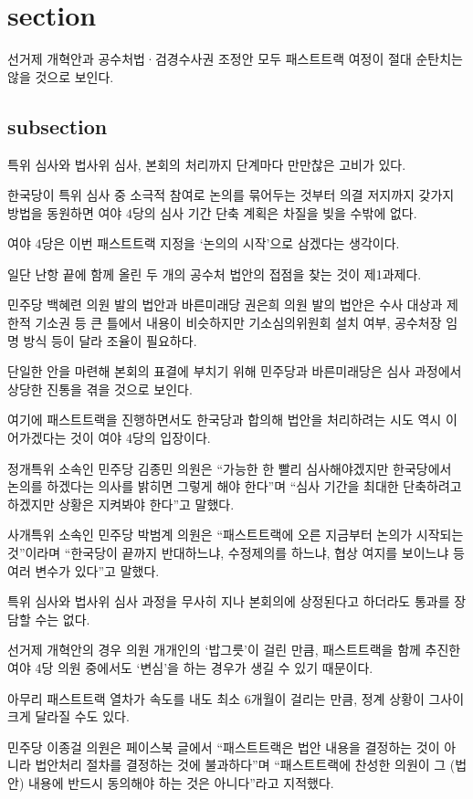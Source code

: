 \documentclass[final,doctor,korean,pdfdoc]{konkukthesis}
\begin{document}
\section{section}
선거제 개혁안과 공수처법·검경수사권 조정안 모두 패스트트랙 여정이 절대 순탄치는 않을 것으로 보인다.
\subsection{subsection}
특위 심사와 법사위 심사, 본회의 처리까지 단계마다 만만찮은 고비가 있다.

한국당이 특위 심사 중 소극적 참여로 논의를 묶어두는 것부터 의결 저지까지 갖가지 방법을 동원하면 여야 4당의 심사 기간 단축 계획은 차질을 빚을 수밖에 없다.

여야 4당은 이번 패스트트랙 지정을 `논의의 시작'으로 삼겠다는 생각이다.

일단 난항 끝에 함께 올린 두 개의 공수처 법안의 접점을 찾는 것이 제1과제다.

민주당 백혜련 의원 발의 법안과 바른미래당 권은희 의원 발의 법안은 수사 대상과 제한적 기소권 등 큰 틀에서 내용이 비슷하지만 기소심의위원회 설치 여부, 공수처장 임명 방식 등이 달라 조율이 필요하다.

단일한 안을 마련해 본회의 표결에 부치기 위해 민주당과 바른미래당은 심사 과정에서 상당한 진통을 겪을 것으로 보인다.

여기에 패스트트랙을 진행하면서도 한국당과 합의해 법안을 처리하려는 시도 역시 이어가겠다는 것이 여야 4당의 입장이다.

정개특위 소속인 민주당 김종민 의원은 ``가능한 한 빨리 심사해야겠지만 한국당에서 논의를 하겠다는 의사를 밝히면 그렇게 해야 한다''며 ``심사 기간을 최대한 단축하려고 하겠지만 상황은 지켜봐야 한다''고 말했다.

사개특위 소속인 민주당 박범계 의원은 ``패스트트랙에 오른 지금부터 논의가 시작되는 것''이라며 ``한국당이 끝까지 반대하느냐, 수정제의를 하느냐, 협상 여지를 보이느냐 등 여러 변수가 있다''고 말했다.

특위 심사와 법사위 심사 과정을 무사히 지나 본회의에 상정된다고 하더라도 통과를 장담할 수는 없다.

선거제 개혁안의 경우 의원 개개인의 `밥그릇'이 걸린 만큼, 패스트트랙을 함께 추진한 여야 4당 의원 중에서도 `변심'을 하는 경우가 생길 수 있기 때문이다.

아무리 패스트트랙 열차가 속도를 내도 최소 6개월이 걸리는 만큼, 정계 상황이 그사이 크게 달라질 수도 있다.

민주당 이종걸 의원은 페이스북 글에서 ``패스트트랙은 법안 내용을 결정하는 것이 아니라 법안처리 절차를 결정하는 것에 불과하다''며 ``패스트트랙에 찬성한 의원이 그 (법안) 내용에 반드시 동의해야 하는 것은 아니다''라고 지적했다.
\end{document}
